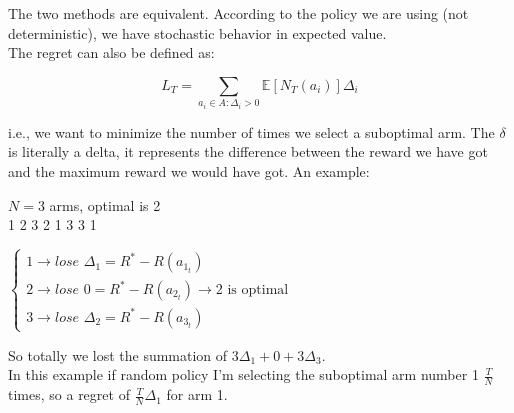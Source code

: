     The two methods are equivalent. According to the policy we are using (not deterministic), we have stochastic behavior in expected value.\\
    The regret can also be defined as:
    \begin{LARGE}
        $$L_T=\sum_{a_i\in A:\Delta_i>0}\mathbb{E}[N_T(a_i)]\Delta_i$$
    \end{LARGE}
    i.e., we want to minimize the number of times we select a suboptimal arm. The $\delta$ is literally a delta, it represents the difference between the reward we have got and the maximum reward we would have got. An example:

    \vspace{1em}
    $N=3$ arms, optimal is 2\\
    1 2 3 2 1 3 3 1

    $
    \begin{cases}
        1\rightarrow lose\,\,\Delta_1=R^*-R(a_{1_t})\\
        2\rightarrow lose\,\,0=R^*-R(a_{2_t})\rightarrow \text{2 is optimal}\\
        3\rightarrow lose\,\,\Delta_2=R^*-R(a_{3_t})
    \end{cases}
    $

    So totally we lost the summation of $3\Delta_1+0+3\Delta_3$.\\
    In this example if random policy I'm selecting the suboptimal arm number 1 $\frac{T}{N}$ times, so a regret of $\frac{T}{N}\Delta_1$ for arm 1.
    
